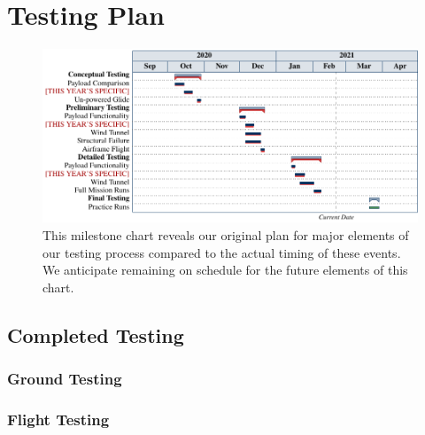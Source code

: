 \documentclass[report]{byu-aero}
\begin{document}
\section{Testing Plan} %
\label{sec:TestingPlan}


\begin{figure}[h!]
	\centering
	\includegraphics[]{testingchart.pdf}
	\caption{This milestone chart reveals our {\color{\BYUblue}original plan} for major elements of our testing process compared to the {\color{\BYUred}actual timing} of these events. We anticipate remaining on schedule for the {\color{\BYUgreen} future elements} of this chart.}
	\label{fig:plannedvsactualtimingtesting}
\end{figure}



\subsection{Completed Testing}
\label{ssec:completedtesting}

\lipsum[1-2]


\subsubsection{Ground Testing}
\label{sssec:groundtesting}

\lipsum[1-10]

\subsubsection{Flight Testing}
\label{sssec:flighttesting}
\end{document}
